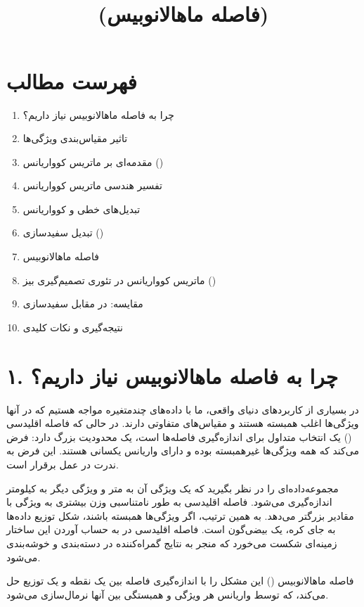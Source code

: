 \documentclass{article}
\title{\lr{Mahalanobis Distance} \\ (فاصله ماهالانوبیس)}
\author{}
\date{}
\begin{document}
\maketitle

\section*{فهرست مطالب}
\begin{enumerate}
    \item چرا به فاصله ماهالانوبیس نیاز داریم؟
    \item تاثیر مقیاس‌بندی ویژگی‌ها
    \item مقدمه‌ای بر ماتریس کوواریانس ()
    \item تفسیر هندسی ماتریس کوواریانس
    \item تبدیل‌های خطی و کوواریانس
    \item تبدیل سفیدسازی ()
    \item فاصله ماهالانوبیس
    \item ماتریس کوواریانس در تئوری تصمیم‌گیری بیز ()
    \item مقایسه:  در مقابل سفیدسازی
    \item نتیجه‌گیری و نکات کلیدی
\end{enumerate}

\newpage

\section*{۱. چرا به فاصله ماهالانوبیس نیاز داریم؟}
در بسیاری از کاربردهای دنیای واقعی، ما با داده‌های چندمتغیره مواجه هستیم که در آنها ویژگی‌ها اغلب همبسته هستند و مقیاس‌های متفاوتی دارند. در حالی که فاصله اقلیدسی () یک انتخاب متداول برای اندازه‌گیری فاصله‌ها است، یک محدودیت بزرگ دارد: فرض می‌کند که همه ویژگی‌ها غیرهمبسته بوده و دارای واریانس یکسانی هستند. این فرض به ندرت در عمل برقرار است.

مجموعه‌داده‌ای را در نظر بگیرید که یک ویژگی آن به متر و ویژگی دیگر به کیلومتر اندازه‌گیری می‌شود. فاصله اقلیدسی به طور نامتناسبی وزن بیشتری به ویژگی با مقادیر بزرگتر می‌دهد. به همین ترتیب، اگر ویژگی‌ها همبسته باشند، شکل توزیع داده‌ها به جای کره، یک بیضی‌گون است. فاصله اقلیدسی در به حساب آوردن این ساختار زمینه‌ای شکست می‌خورد که منجر به نتایج گمراه‌کننده در دسته‌بندی و خوشه‌بندی می‌شود.

فاصله ماهالانوبیس () این مشکل را با اندازه‌گیری فاصله بین یک نقطه و یک توزیع حل می‌کند، که توسط واریانس هر ویژگی و همبستگی بین آنها نرمال‌سازی می‌شود.
\end{document}
